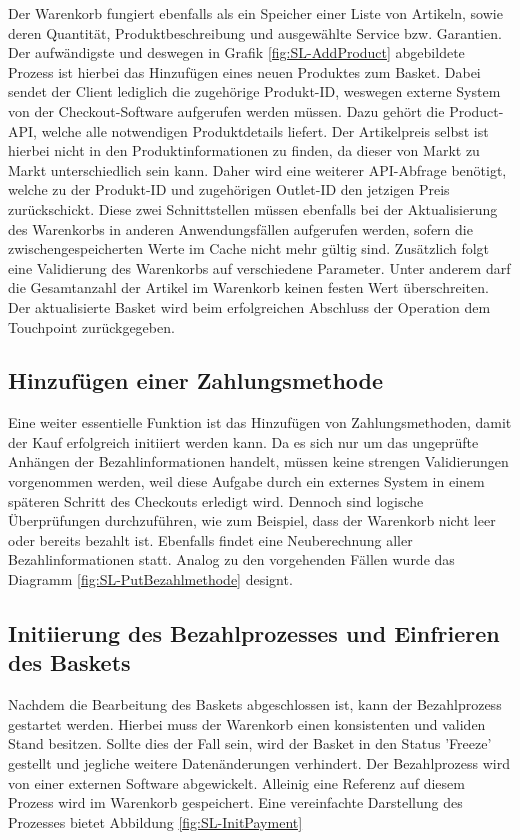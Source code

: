 Der Warenkorb fungiert ebenfalls als ein Speicher einer Liste von Artikeln, sowie deren Quantität, Produktbeschreibung und ausgewählte Service bzw. Garantien. Der aufwändigste und deswegen in Grafik \ref{fig:SL-AddProduct} abgebildete Prozess ist hierbei das Hinzufügen eines neuen Produktes zum Basket. Dabei sendet der Client lediglich die zugehörige Produkt-ID, weswegen externe System von der Checkout-Software aufgerufen werden müssen. Dazu gehört die Product-API, welche alle notwendigen Produktdetails liefert. Der Artikelpreis selbst ist hierbei nicht in den Produktinformationen zu finden, da dieser von Markt zu Markt unterschiedlich sein kann. Daher wird eine weiterer API-Abfrage benötigt, welche zu der Produkt-ID und zugehörigen Outlet-ID den jetzigen Preis zurückschickt. Diese zwei Schnittstellen müssen ebenfalls bei der Aktualisierung des Warenkorbs in anderen Anwendungsfällen aufgerufen werden, sofern die zwischengespeicherten Werte im Cache nicht mehr gültig sind. Zusätzlich folgt eine Validierung des Warenkorbs auf verschiedene Parameter. Unter anderem darf die Gesamtanzahl der Artikel im Warenkorb keinen festen Wert überschreiten. Der aktualisierte Basket wird beim erfolgreichen Abschluss der Operation dem Touchpoint zurückgegeben.

\subsection{Hinzufügen einer Zahlungsmethode}

Eine weiter essentielle Funktion ist das Hinzufügen von Zahlungsmethoden, damit der Kauf erfolgreich initiiert werden kann. Da es sich nur um das ungeprüfte Anhängen der Bezahlinformationen handelt, müssen keine strengen Validierungen vorgenommen werden, weil diese Aufgabe durch ein externes System in einem späteren Schritt des Checkouts erledigt wird. Dennoch sind logische Überprüfungen durchzuführen, wie zum Beispiel, dass der Warenkorb nicht leer oder bereits bezahlt ist. Ebenfalls findet eine Neuberechnung aller Bezahlinformationen statt. Analog zu den vorgehenden Fällen wurde das Diagramm \ref{fig:SL-PutBezahlmethode} designt.

\subsection{Initiierung des Bezahlprozesses und Einfrieren des Baskets}

Nachdem die Bearbeitung des Baskets abgeschlossen ist, kann der Bezahlprozess gestartet werden. Hierbei muss der Warenkorb einen konsistenten und validen Stand besitzen. Sollte dies der Fall sein, wird der Basket in den Status 'Freeze' gestellt und jegliche weitere Datenänderungen verhindert. Der Bezahlprozess wird von einer externen Software abgewickelt. Alleinig eine Referenz auf diesem Prozess wird im Warenkorb gespeichert. Eine vereinfachte Darstellung des Prozesses bietet Abbildung \ref{fig:SL-InitPayment}

